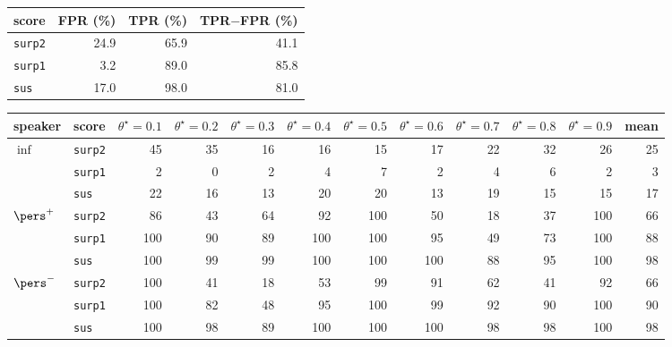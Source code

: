 \begin{tabular}{lrrr}
\toprule
score & FPR (\%) & TPR (\%) & TPR$-$FPR (\%) \\
\midrule
\texttt{surp2} & 24.9 & 65.9 & 41.1 \\
\texttt{surp1} & 3.2 & 89.0 & 85.8 \\
\texttt{sus} & 17.0 & 98.0 & 81.0 \\
\bottomrule
\end{tabular}

\begin{tabular}{llrrrrrrrrrr}
\toprule
speaker & score & $\theta^\star=0.1$ & $\theta^\star=0.2$ & $\theta^\star=0.3$ & $\theta^\star=0.4$ & $\theta^\star=0.5$ & $\theta^\star=0.6$ & $\theta^\star=0.7$ & $\theta^\star=0.8$ & $\theta^\star=0.9$ & mean \\
\midrule
$\inf$ & \texttt{surp2} & 45 & 35 & 16 & 16 & 15 & 17 & 22 & 32 & 26 & 25 \\
 & \texttt{surp1} & 2 & 0 & 2 & 4 & 7 & 2 & 4 & 6 & 2 & 3 \\
 & \texttt{sus} & 22 & 16 & 13 & 20 & 20 & 13 & 19 & 15 & 15 & 17 \\
\midrule
$\pers^{+}$ & \texttt{surp2} & 86 & 43 & 64 & 92 & 100 & 50 & 18 & 37 & 100 & 66 \\
 & \texttt{surp1} & 100 & 90 & 89 & 100 & 100 & 95 & 49 & 73 & 100 & 88 \\
 & \texttt{sus} & 100 & 99 & 99 & 100 & 100 & 100 & 88 & 95 & 100 & 98 \\
\midrule
$\pers^{-}$ & \texttt{surp2} & 100 & 41 & 18 & 53 & 99 & 91 & 62 & 41 & 92 & 66 \\
 & \texttt{surp1} & 100 & 82 & 48 & 95 & 100 & 99 & 92 & 90 & 100 & 90 \\
 & \texttt{sus} & 100 & 98 & 89 & 100 & 100 & 100 & 98 & 98 & 100 & 98 \\
\bottomrule
\end{tabular}

